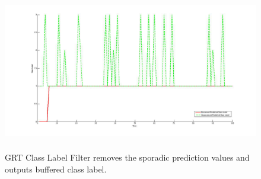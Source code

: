 \begin{figure}
	[h] \centering 
	\includegraphics[height=7cm]{figures/content/grt-label-filter.jpg} \caption{GRT Class Label Filter removes the sporadic prediction values and outputs buffered class label.  \cite{grt-spec}} \label{fg:grt:label} 
\end{figure}
